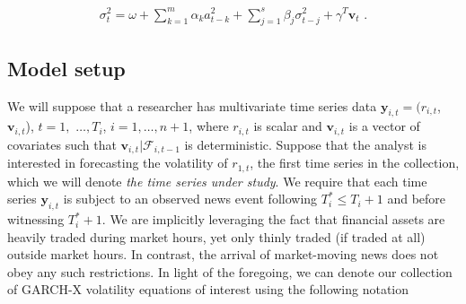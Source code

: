 \documentclass[11pt,3p,review,authoryear]{elsarticle}
\newcommand{\y}{\textbf{y}}
\newcommand{\x}{\textbf{v}}
\theoremstyle{definition}
\begin{document}
\begin{align}
\sigma_{t}^{2} = \omega+ \sum^{m}_{k=1}\alpha_{k}a^{2}_{t-k} + \sum_{j=1}^{s}\beta_{j}\sigma_{t-j}^{2} + \gamma^{T}\x_{t} \text{ .}\label{GARCH-X}
\end{align}


\subsection{Model setup}
\label{modelsetup}
We will suppose that a researcher has multivariate time series data $\y_{i,t} = (r_{i,t}$, $\x_{i,t}$), $t = 1,$ $\ldots,  T_i$, $i = 1, \ldots, n+1$, where $r_{i,t}$ is scalar and $\x_{i,t}$ is a vector of covariates such that $\x_{i,t}|\mathcal{F}_{i,t-1}$ is deterministic.  Suppose that the analyst is interested in forecasting the volatility of $r_{1,t}$, the first time series in the collection, which we will denote \textit{the time series under study}.  We require that each time series $\y_{i,t}$ is subject to an observed news event following $T^*_i \leq T_{i} + 1$ and before witnessing $T^*_i+1$.  We are implicitly leveraging the fact that financial assets are heavily traded during market hours, yet only thinly traded (if traded at all) outside market hours.  In contrast, the arrival of market-moving news does not obey any such restrictions.  In light of the foregoing, we can denote our collection of GARCH-X volatility equations of interest using the following notation
\end{document}
